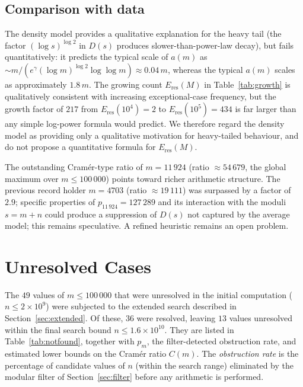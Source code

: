 \documentclass[12pt]{article}
\begin{document}
	\subsection{Comparison with data}
	
	The density model provides a qualitative explanation for the heavy tail
	(the factor $(\log s)^{\log 2}$ in $D(s)$ produces slower-than-power-law
	decay), but fails quantitatively: it predicts the typical scale of
	$a(m)$ as $\sim m/(e^{\gamma} (\log m)^{\log 2} \log\log m)
	\approx 0.04\,m$, whereas the typical $a(m)$ scales as
	approximately $1.8\,m$.
	The growing count $E_{\mathrm{res}}(M)$ in Table~\ref{tab:growth} is
	qualitatively consistent with increasing exceptional-case frequency,
	but the growth factor of $217$ from $E_{\mathrm{res}}(10^4) = 2$ to
	$E_{\mathrm{res}}(10^5) = 434$ is far larger than any simple log-power
	formula would predict.
	We therefore regard the density model as providing only a qualitative
	motivation for heavy-tailed behaviour, and do not propose a
	quantitative formula for $E_{\mathrm{res}}(M)$.
	
	The outstanding Cram\'er-type ratio of $m = 11\,924$
	(ratio $\approx 54\,679$, the global maximum over
	$m \leq 100\,000$) points toward richer arithmetic structure.
	The previous record holder $m = 4703$ (ratio $\approx 19\,111$)
	was surpassed by a factor of~$2.9$; specific properties of
	$p_{11\,924} = 127\,289$ and its
	interaction with the moduli $s = m+n$ could produce a suppression
	of $D(s)$ not captured by the average model; this remains speculative.
	A refined heuristic remains an open problem.
	
	\section{Unresolved Cases}
	\label{sec:notfound}
	
	The $49$ values of $m \leq 100\,000$ that were unresolved in the
	initial computation ($n \leq 2 \times 10^9$) were subjected to the
	extended search described in Section~\ref{sec:extended}.
	Of these, $36$ were resolved, leaving $13$ values unresolved
	within the final search bound $n \leq 1.6 \times 10^{10}$.
	They are listed in Table~\ref{tab:notfound}, together with $p_m$,
	the filter-detected obstruction rate, and estimated lower bounds on
	the Cram\'er ratio $C(m)$.
	The \emph{obstruction rate} is the percentage of candidate values of $n$
	(within the search range) eliminated by the modular filter of
	Section~\ref{sec:filter} before any arithmetic is performed.
	
\end{document}
